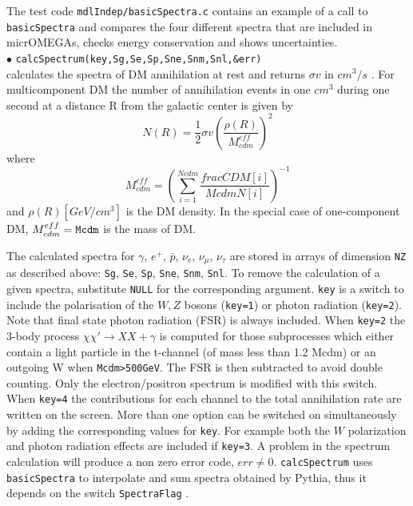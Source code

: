 \documentclass[12pt,a4paper]{article}
\begin{document}
The test code  {\tt mdlIndep/basicSpectra.c} contains an example of a call to {\tt basicSpectra} and compares the four different spectra that are included in micrOMEGAs,   checks energy conservation and shows uncertainties.  \\

 
  
\noindent
$\bullet$ \verb|calcSpectrum(key,Sg,Se,Sp,Sne,Snm,Snl,&err)|\\
calculates  the spectra  of DM annihilation 
at rest and returns $\sigma v$ in $cm^3/s$ . 
For multicomponent DM the number of annihilation events in one $cm^{3}$   during one second  at a distance R from the  galactic center is given by
\begin{equation}
      N(R)=\frac{1}{2} \sigma v \left( \frac{\rho(R)}{M_{cdm}^{eff}}\right)^2
\end{equation}
where 
\begin{equation} 
  \label{McdmEff}
  M_{cdm}^{eff}= \left( \sum_{i=1}^{Ncdm} \frac{fracCDM[i]}{McdmN[i]}\right)^{-1}
\end{equation}  
and $\rho(R) [GeV/cm^3]$ is the DM density. In the special  case of one-component DM,  $M_{cdm}^{eff}={\tt Mcdm}$  is the mass  of DM. 


The calculated spectra
for $\gamma$, $e^+$, $\bar{p}$, $\nu_e$, $\nu_{\mu}$, $\nu_{\tau}$ 
are stored in arrays of dimension \verb|NZ| as described above: \verb|Sg|, \verb|Se|, \verb|Sp|, \verb|Sne|, \verb|Snm|, \verb|Snl|. 
 To remove the calculation of a given spectra, substitute  
\verb|NULL| for the corresponding argument. 
\verb|key| is a switch to include the polarisation of the  $W,Z$ bosons (\verb|key=1|) or
 photon radiation (\verb|key=2|).  
 Note that final state photon radiation (FSR) is always included.
When \verb|key=2| the 3-body  process $\chi\chi'\rightarrow XX +\gamma$ is computed for those subprocesses which either contain a light particle in the t-channel (of mass less than 1.2 Mcdm) or an outgoing W when \verb|Mcdm>500GeV|. The FSR is then subtracted to avoid double counting.
Only the electron/positron spectrum is modified with this switch.
When \verb|key=4| the contributions  for each  channel to the total
annihilation rate  are written on the screen. More than one option
can be switched on simultaneously by adding the corresponding values for \verb|key|. 
For example both the $W$ polarization and photon radiation effects  are included if
\verb|key=3|.
A problem in the spectrum calculation will produce a non zero error code, $err\neq
0$. {\tt calcSpectrum} uses {\tt basicSpectra} to  interpolate and sum spectra obtained by Pythia, thus it depends on the switch  {\tt SpectraFlag} .\\
\end{document}
